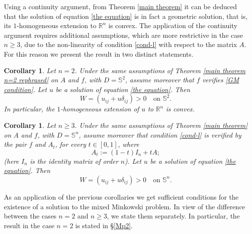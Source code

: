 \documentclass[12pt]{amsart}
\newtheorem{corollary}[theorem]{Corollary}
\newcommand{\R}{\mathbb R}
\newcommand{\1}{\mathbf 1}
\newcommand{\s}{\mathbb S}
\newcommand{\sfe}{{{\mathbb S}^{n}}}
\begin{document}
\medskip

Using a continuity argument, from Theorem \ref {main theorem} it can be deduced that the solution of equation \eqref{the equation} is in fact a geometric solution, that is, its $1$-homogeneous extension to $\R^n$ is convex. The application of the continuity argument requires additional assumptions, which are more restrictive in the case $n\ge3$, due to the non-linearity of condition \eqref{cond-l} with respect to the matrix $A$. For this reason we present the result in two distinct statements.

\begin{corollary}\label{the corollary} 
Let $n=2$. Under the same assumptions of Theorem \ref{main theorem n=2 rephrased} on $A$ and $f$, with $D=\s^2$, assume moreover that $f$ verifies \eqref{GM condition}. Let $u$ be a solution of equation \eqref{the equation}. Then 
\[
W=(u_{ij}+u\delta_{ij})>0\quad\mbox{on $\s^2$.}
\]  
In particular, the $1$-homogeneous extension of $u$ to $\R^n$ is convex.
\end{corollary}

\begin{corollary}\label{the corollary nge3} 
Let $n\ge3$. Under the same assumptions of Theorem \ref{main theorem} on $A$ and $f$, with $D=\sfe$, assume moreover that condition \eqref{cond-l} is verified by the pair $f$ and $A_t$, for every $t\in[0,1]$, where
$$
A_t:=(1-t)I_{n}+tA;
$$
(here $I_n$ is the identity matrix of order $n$). Let $u$ be a solution of equation \eqref{the equation}. Then 
\[
W=(u_{ij}+u\delta_{ij})>0\quad\mbox{on $\sfe$.}
\]  
\end{corollary}

As an application of the previous corollaries we get sufficient conditions for the existence of a solution to the mixed Minkowski problem. In view of the difference between the cases $n=2$ and $n\ge3$, we state them separately. In particular, the result in the case $n=2$ is stated in \S \ref{Mp2}. 
\end{document}
